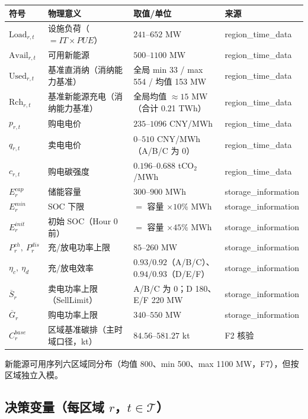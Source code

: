 \documentclass{internal-report}
\begin{document}
\begin{center}
\footnotesize
\begin{tabular}{llll}
\toprule
符号 & 物理意义 & 取值/单位 & 来源 \\
\midrule
$\mathrm{Load}_{r,t}$ & 设施负荷（$=IT\times PUE$） & $241$--$652$ MW & region\_time\_data \\
$\mathrm{Avail}_{r,t}$ & 可用新能源 & $500$--$1100$ MW & region\_time\_data \\
$\mathrm{Used}_{r,t}$ & 基准直消纳（消纳能力基准） & 全局 min 33 / max 554 / 均值 153 MW & region\_time\_data \\
$\mathrm{Rch}_{r,t}$ & 基准新能源充电（消纳能力基准） & 全局均值 $\approx 15$ MW（合计 0.21 TWh） & region\_time\_data \\
$p_{r,t}$ & 购电电价 & $235$--$1096$ CNY/MWh & region\_time\_data \\
$q_{r,t}$ & 卖电电价 & $0$--$510$ CNY/MWh（A/B/C 为 0） & region\_time\_data \\
$c_{r,t}$ & 购电碳强度 & $0.196$--$0.688$ tCO$_2$/MWh & region\_time\_data \\
$E^{cap}_r$ & 储能容量 & $300$--$900$ MWh & storage\_information \\
$E^{min}_r$ & SOC 下限 & $=$ 容量 $\times 10\%$ MWh & storage\_information \\
$E^{init}_r$ & 初始 SOC（Hour 0 前） & $=$ 容量 $\times 45\%$ MWh & storage\_information \\
$P^{ch}_r,\ P^{dis}_r$ & 充/放电功率上限 & $85$--$260$ MW & storage\_information \\
$\eta_c,\ \eta_d$ & 充/放电效率 & $0.93/0.92$（A/B/C）、$0.94/0.93$（D/E/F） & storage\_information \\
$\overline{S}_r$ & 卖电功率上限（SellLimit） & A/B/C 为 0；D 180、E/F 220 MW & storage\_information \\
$\overline{G}_r$ & 购电功率上限 & $340$--$550$ MW & storage\_information \\
$C^{base}_r$ & 区域基准碳排（主时域口径，kt） & $84.56$--$581.27$ kt & F2 核验 \\
\bottomrule
\end{tabular}
\end{center}

新能源可用序列六区域同分布（均值 800、min 500、max 1100 MW，F7），但按区域独立入模。

\subsection{决策变量（每区域 $r$，$t\in\mathcal{T}$）}
\end{document}
